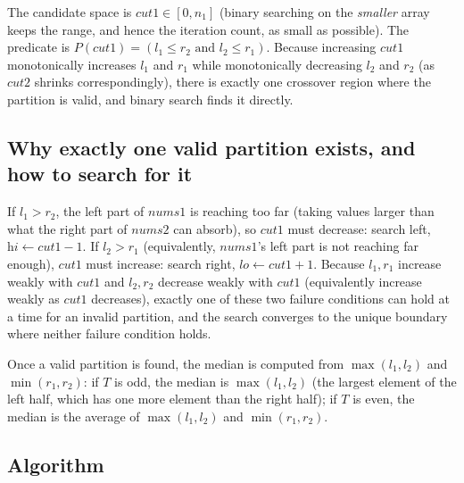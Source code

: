 \begin{ideabox}
The candidate space is $\textit{cut1} \in [0, n_1]$ (binary searching on
the \emph{smaller} array keeps the range, and hence the iteration count,
as small as possible). The predicate is
$P(\textit{cut1}) = (l_1 \le r_2 \text{ and } l_2 \le r_1)$. Because
increasing $\textit{cut1}$ monotonically increases $l_1$ and $r_1$ while
monotonically decreasing $l_2$ and $r_2$ (as $\textit{cut2}$ shrinks
correspondingly), there is exactly one crossover region where the
partition is valid, and binary search finds it directly.
\end{ideabox}

\subsection*{Why exactly one valid partition exists, and how to search for it}

If $l_1 > r_2$, the left part of $\textit{nums1}$ is reaching too far
(taking values larger than what the right part of $\textit{nums2}$ can
absorb), so $\textit{cut1}$ must decrease: search left,
$\textit{hi} \gets \textit{cut1}-1$. If $l_2 > r_1$ (equivalently,
$\textit{nums1}$'s left part is not reaching far enough), $\textit{cut1}$
must increase: search right, $\textit{lo} \gets \textit{cut1}+1$. Because
$l_1, r_1$ increase weakly with $\textit{cut1}$ and $l_2, r_2$ decrease
weakly with $\textit{cut1}$ (equivalently increase weakly as
$\textit{cut1}$ decreases), exactly one of these two failure conditions
can hold at a time for an invalid partition, and the search converges to
the unique boundary where neither failure condition holds.

Once a valid partition is found, the median is computed from
$\max(l_1, l_2)$ and $\min(r_1, r_2)$: if $T$ is odd, the median is
$\max(l_1, l_2)$ (the largest element of the left half, which has one more
element than the right half); if $T$ is even, the median is the average of
$\max(l_1, l_2)$ and $\min(r_1, r_2)$.

\subsection*{Algorithm}


